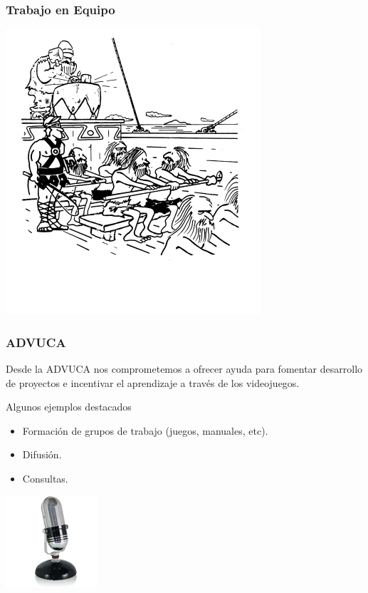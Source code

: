 \begin{frame}
	\frametitle{Trabajo en Equipo}
	
	\begin{center}
		\includegraphics[scale=0.70]{img/equipo.jpg}
	\end{center}

\end{frame}


\begin{frame}
	\frametitle{ADVUCA}
		
	Desde la ADVUCA nos comprometemos a ofrecer ayuda para fomentar desarrollo de proyectos e incentivar el aprendizaje a través de los videojuegos.

	\begin{block}{Algunos ejemplos destacados}
		\begin{itemize}
			\item Formación de grupos de trabajo (juegos, manuales, etc).
			\item Difusión.
			\item Consultas.
		\end{itemize}
	\end{block}

	\begin{center}
		\includegraphics[scale=0.50]{img/micro.png}
	\end{center}

\end{frame}

